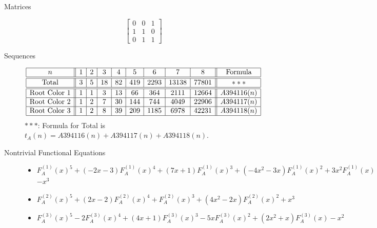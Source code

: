 \documentclass[12pt]{amsart}
\newcommand{\gff}[2]{F_{#2}^{(#1)}(x)}
\newcommand{\gfa}[1]{\gff{#1}{A}}
\begin{document}
\begin{description}
    \item[Matrices]
    
    \[\begin{bmatrix}
0 & 0 & 1 \\
1 & 1 & 0 \\
0 & 1 & 1
\end{bmatrix}\]
    \item[Sequences]\hspace*{\fill}\vspace{-0.5cm}
    \begin{center}
        \[
        \begin{array}{|c||c|c|c|c|c|c|c|c||c|}\hline
           n  & 1 & 2 & 3 & 4 & 5 & 6 & 7 & 8  & \text{Formula}\\\hline\hline
           \text{Total}  & 3 & 5 & 18 & 82 & 419 & 2293 & 13138 & 77801 & ***\\\hline\hline
           \text{Root Color }1 & 1 & 1 & 3 & 13 & 66 & 364 & 2111 & 12664 & A394116(n)\\\hline
           \text{Root Color }2 & 1 & 2 & 7 & 30 & 144 & 744 & 4049 & 22906 & A394117(n) \\\hline
           \text{Root Color }3 & 1 & 2 & 8 & 39 & 209 & 1185 & 6978 & 42231 & A394118(n) \\\hline
        \end{array}
        \]
        $***$: Formula for Total is $t_A(n)=A394116(n) + A394117(n) + A394118(n)$.
    \end{center}
    
    \item[Nontrivial Functional Equations]\hspace*{\fill}

    \begin{itemize}
\item $\gfa{1}^5+(-2x - 3)\gfa{1}^4+(7x + 1)\gfa{1}^3+(-4x^2 - 3x)\gfa{1}^2+3x^2\gfa{1}$ $-x^3$


\item $\gfa{2}^5+(2x - 2)\gfa{2}^4+\gfa{2}^3+(4x^2 - 2x)\gfa{2}^2+x^3$


\item $\gfa{3}^5-2\gfa{3}^4+(4x + 1)\gfa{3}^3-5x\gfa{3}^2+(2x^2 + x)\gfa{3}-x^2$


\end{itemize}
    
\end{description}
\end{document}
